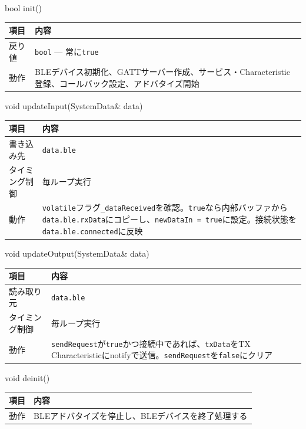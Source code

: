 \begin{funcblock}{bool init()}
\begin{tabularx}{\textwidth}{l X}
\toprule
\textbf{項目} & \textbf{内容} \\
\midrule
戻り値     & \texttt{bool} --- 常に\texttt{true} \\
動作       & BLEデバイス初期化、GATTサーバー作成、サービス・Characteristic登録、コールバック設定、アドバタイズ開始 \\
\bottomrule
\end{tabularx}
\end{funcblock}

\begin{funcblock}{void updateInput(SystemData\& data)}
\begin{tabularx}{\textwidth}{l X}
\toprule
\textbf{項目} & \textbf{内容} \\
\midrule
書き込み先     & \texttt{data.ble} \\
タイミング制御 & 毎ループ実行 \\
動作           & \texttt{volatile}フラグ\texttt{\_dataReceived}を確認。\texttt{true}なら内部バッファから\texttt{data.ble.rxData}にコピーし、\texttt{newDataIn = true}に設定。接続状態を\texttt{data.ble.connected}に反映 \\
\bottomrule
\end{tabularx}
\end{funcblock}

\begin{funcblock}{void updateOutput(SystemData\& data)}
\begin{tabularx}{\textwidth}{l X}
\toprule
\textbf{項目} & \textbf{内容} \\
\midrule
読み取り元     & \texttt{data.ble} \\
タイミング制御 & 毎ループ実行 \\
動作           & \texttt{sendRequest}が\texttt{true}かつ接続中であれば、\texttt{txData}をTX Characteristicにnotifyで送信。\texttt{sendRequest}を\texttt{false}にクリア \\
\bottomrule
\end{tabularx}
\end{funcblock}

\begin{funcblock}{void deinit()}
\begin{tabularx}{\textwidth}{l X}
\toprule
\textbf{項目} & \textbf{内容} \\
\midrule
動作   & BLEアドバタイズを停止し、BLEデバイスを終了処理する \\
\bottomrule
\end{tabularx}
\end{funcblock}

